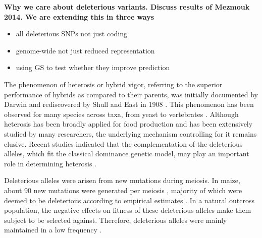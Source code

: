 \documentclass[10pt]{article}
\begin{document}

\textbf{Why we care about deleterious variants. Discuss results of Mezmouk 2014. We are extending this in three ways}  
\begin{itemize}
  \item all deleterious SNPs not just coding
  \item genome-wide not just reduced representation
  \item using GS to test whether they improve prediction
\end{itemize}



The phenomenon of heterosis or hybrid vigor, referring to the superior performance of hybrids as compared to their parents, was initially documented by Darwin and rediscovered by Shull and East in 1908 \citep{Duvick2001}. This phenomenon has been observed for many species across taxa, from yeast \citep{Shapira2014} to vertebrates \citep{Gama2013}. Although heterosis has been broadly applied for food production and has been extensively studied by many researchers, the underlying mechanism controlling for it remains elusive. Recent studies indicated that the complementation of the deleterious alleles, which fit the classical dominance genetic model, may play an important role in determining heterosis \citep{Charlesworth2009}. 

Deleterious alleles were arisen from new mutations during meiosis. In maize, about 90 new mutations were generated per meiosis \citep{Clark2005}, majority of which were deemed to be deleterious according to empirical estimates \citep{Joseph2004}. In a natural outcross population, the negative effects on fitness of these deleterious alleles make them subject to be selected against. Therefore, deleterious alleles were mainly maintained in a low frequency \citep{Eyre-Walker2007}. 


\end{document}
